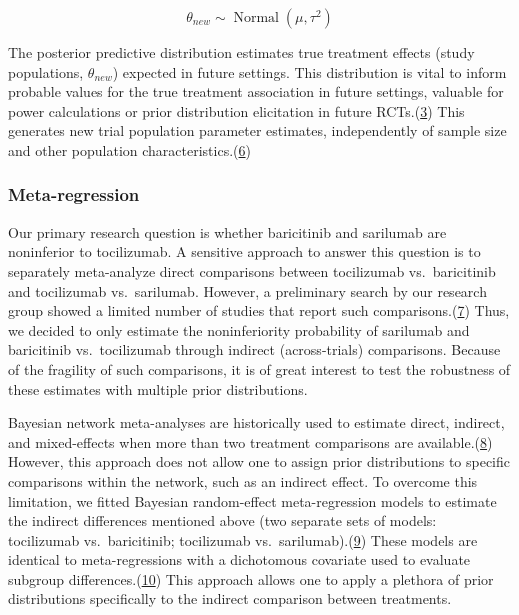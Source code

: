 \documentclass[
  12pt,
]{article}
\begin{document}
\[\theta_{new} \sim \operatorname{Normal}(\mu, \tau^2)\]

The posterior predictive distribution estimates true treatment effects
(study populations, \(\theta_{new}\)) expected in future settings. This
distribution is vital to inform probable values for the true treatment
association in future settings, valuable for power calculations or prior
distribution elicitation in future
RCTs.(\protect\hyperlink{ref-spiegelhalter2004}{3}) This generates new
trial population parameter estimates, independently of sample size and
other population
characteristics.(\protect\hyperlink{ref-higgins2009}{6})

\hypertarget{meta-regression}{%
\subsubsection{Meta-regression}\label{meta-regression}}

Our primary research question is whether baricitinib and sarilumab are
noninferior to tocilizumab. A sensitive approach to answer this question
is to separately meta-analyze direct comparisons between tocilizumab
vs.~baricitinib and tocilizumab vs.~sarilumab. However, a preliminary
search by our research group showed a limited number of studies that
report such comparisons.(\protect\hyperlink{ref-zotero-3144}{7}) Thus,
we decided to only estimate the noninferiority probability of sarilumab
and baricitinib vs.~tocilizumab through indirect (across-trials)
comparisons. Because of the fragility of such comparisons, it is of
great interest to test the robustness of these estimates with multiple
prior distributions.

Bayesian network meta-analyses are historically used to estimate direct,
indirect, and mixed-effects when more than two treatment comparisons are
available.(\protect\hyperlink{ref-dias2018}{8}) However, this approach
does not allow one to assign prior distributions to specific comparisons
within the network, such as an indirect effect. To overcome this
limitation, we fitted Bayesian random-effect meta-regression models to
estimate the indirect differences mentioned above (two separate sets of
models: tocilizumab vs.~baricitinib; tocilizumab
vs.~sarilumab).(\protect\hyperlink{ref-pitchforth2012}{9}) These models
are identical to meta-regressions with a dichotomous covariate used to
evaluate subgroup differences.(\protect\hyperlink{ref-thompson2002}{10})
This approach allows one to apply a plethora of prior distributions
specifically to the indirect comparison between treatments.
\end{document}
